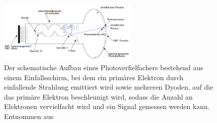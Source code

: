                 \FloatBarrier

                \begin{figure}[h]
                  \centering
                  \includegraphics[width = 0.6\textwidth]{pictures/photomultiplier.png}
                  \caption{Der schematische Aufbau eines Photoverfielfachers bestehend aus einem Einfallsschirm, bei dem ein primäres Elektron durch einfallende Strahlung emittiert wird sowie mehreren Dyoden, auf die das primäre Elektron beschleunigt wird, sodass die Anzahl an Elektronen vervielfacht wird und ein Signal gemessen werden kann. Entnommen aus \cite{kolanoski_teilchendetektoren_2016}}
                  \label{fig:photomultiplier}
                \end{figure}
        
                \FloatBarrier
        
                \noindent 

